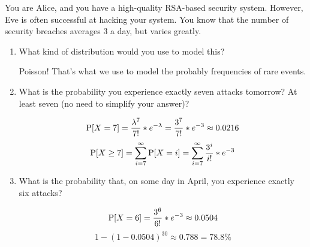 \question You are Alice, and you have a high-quality RSA-based security 
system. However, Eve is often successful at hacking your system. You 
know that the number of security breaches averages 3 a day, but varies greatly.

\begin{enumerate}[label=(\alph*)]
\item What kind of distribution would you use to model this?
\begin{solution}[2cm]
Poisson! That's what we use to model the probably frequencies of rare 
events.
\end{solution}

\item What is the probability you experience exactly seven attacks 
tomorrow? At least seven (no need to simplify your answer)?
\begin{solution}[2cm]
\[\P[X=7] = \frac{\lambda^7}{7!} * e^{-\lambda} = \frac{3^7}{7!} * 
e^{-3} \approx 0.0216\]
\[\P[X \geq 7] = \sum_{i=7}^{\infty}\P[X = i] = \sum_{i = 7}^{\infty} 
\frac{3^i}{i!} * e^{-3} \]
\end{solution}

\item What is the probability that, on some day in April, you experience 
exactly six attacks?
\begin{solution}[2cm]
\[\P[X=6] = \frac{3^6}{6!} * e^{-3} \approx 0.0504 \]
\[1 - (1 - 0.0504)^{30} \approx 0.788 = 78.8\%\]
\end{solution}
\end{enumerate}